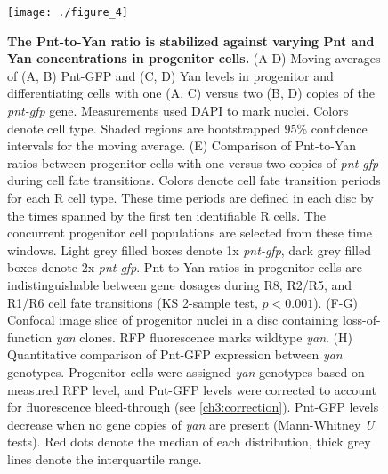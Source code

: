 \begin{figure}[h]
\centering
\texttt{[image: ./figure\_4]}
\caption[The Pnt-to-Yan ratio is stabilized against varying Pnt and Yan concentrations in progenitor cells.]{\textbf{The Pnt-to-Yan ratio is stabilized against varying Pnt and Yan concentrations in progenitor cells.} (A-D) Moving averages of (A, B) Pnt-GFP and (C, D) Yan levels in progenitor and differentiating cells with one (A, C) versus two (B, D) copies of the \textit{pnt-gfp} gene. Measurements used DAPI to mark nuclei. Colors denote cell type. Shaded regions are bootstrapped 95\% confidence intervals for the moving average. (E) Comparison of Pnt-to-Yan ratios between progenitor cells with one versus two copies of \textit{pnt-gfp} during cell fate transitions. Colors denote cell fate transition periods for each R cell type. These time periods are defined in each disc by the times spanned by the first ten identifiable R cells. The concurrent progenitor cell populations are selected from these time windows. Light grey filled boxes denote 1x \textit{pnt-gfp}, dark grey filled boxes denote 2x \textit{pnt-gfp}. Pnt-to-Yan ratios in progenitor cells are indistinguishable between gene dosages during R8, R2/R5, and R1/R6 cell fate transitions (KS 2-sample test, $p<0.001$). (F-G) Confocal image slice of progenitor nuclei in a disc containing loss-of-function \textit{yan} clones. RFP fluorescence marks wildtype \textit{yan}. (H) Quantitative comparison of Pnt-GFP expression between \textit{yan} genotypes. Progenitor cells were assigned \textit{yan} genotypes based on measured RFP level, and Pnt-GFP levels were corrected to account for fluorescence bleed-through (see \ref{ch3:correction}). Pnt-GFP levels decrease when no gene copies of \textit{yan} are present (Mann-Whitney \textit{U} tests). Red dots denote the median of each distribution, thick grey lines denote the interquartile range.}
\label{fig:ch2:fig4}
\end{figure}

